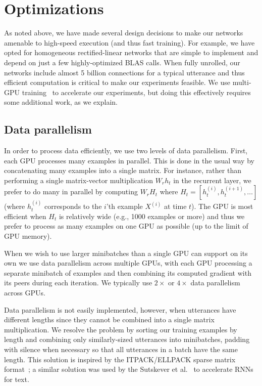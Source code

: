 \section{Optimizations}
\label{sec:deepspeech:optimization}

As noted above, we have made several design decisions to make our networks
amenable to high-speed execution (and thus fast training). For example, we have
opted for homogeneous rectified-linear networks that are simple to implement
and depend on just a few highly-optimized BLAS calls. When fully unrolled, our
networks include almost 5 billion connections for a typical utterance and thus
efficient computation is critical to make our experiments feasible. We use
multi-GPU training~\cite{coates2013cotshpc, krizhevsky2012imagenet} to
accelerate our experiments, but doing this effectively requires some additional
work, as we explain.

\subsection{Data parallelism}
\label{sec:deepspeech:datapar}

In order to process data efficiently, we use two levels of data parallelism.
First, each GPU processes many examples in parallel. This is done in the usual
way by concatenating many examples into a single matrix. For instance, rather
than performing a single matrix-vector multiplication $W_r h_t$ in the
recurrent layer, we prefer to do many in parallel by computing $W_r H_t$ where
$H_t = [ h^{(i)}_{t}, h^{(i+1)}_{t}, \ldots ]$ (where $h_t^{(i)}$ corresponds
to the $i$'th example $X^{(i)}$ at time $t$). The GPU is most efficient when
$H_t$ is relatively wide (e.g., 1000 examples or more) and thus we prefer to
process as many examples on one GPU as possible (up to the limit of GPU
memory).

When we wish to use larger minibatches than a single GPU can support on its own
we use data parallelism across multiple GPUs, with each GPU processing a
separate minibatch of examples and then combining its computed gradient with
its peers during each iteration. We typically use $2\times$ or $4\times$ data
parallelism across GPUs.

Data parallelism is not easily implemented, however, when utterances have
different lengths since they cannot be combined into a single matrix
multiplication. We resolve the problem by sorting our training examples by
length and combining only similarly-sized utterances into minibatches, padding
with silence when necessary so that all utterances in a batch have the same
length. This solution is inspired by the ITPACK/ELLPACK sparse matrix
format~\cite{kincaid1989}; a similar solution was used by the Sutskever et
al.~\cite{sutskever2014} to accelerate RNNs for text.

